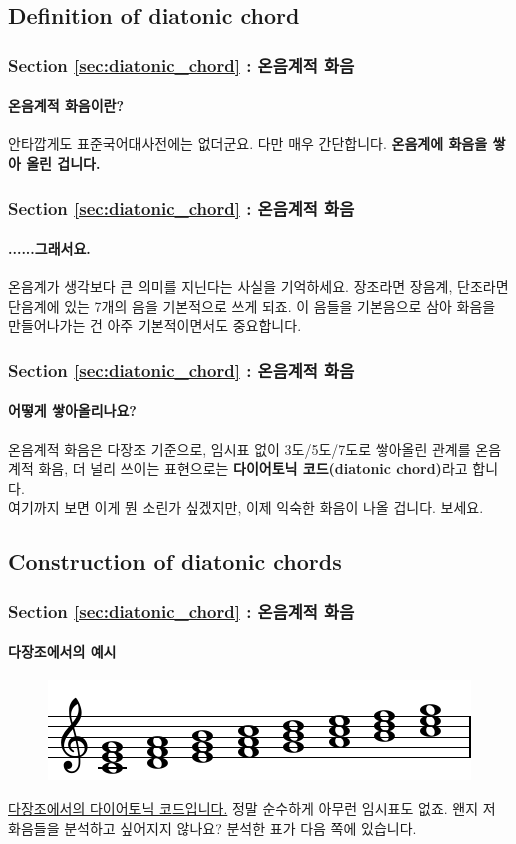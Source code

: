 \documentclass{beamer}
\begin{document}
	\subsection{Definition of diatonic chord}
	\begin{frame}
		\frametitle{Section \ref{sec:diatonic_chord} : 온음계적 화음}
		\framesubtitle{온음계적 화음이란?}
		안타깝게도 표준국어대사전에는 없더군요. 다만 매우 간단합니다. {\bf 온음계에 화음을 쌓아 올린 겁니다.}
	\end{frame}
	
	\begin{frame}
		\frametitle{Section \ref{sec:diatonic_chord} : 온음계적 화음}
		\framesubtitle{......그래서요.}
		온음계가 생각보다 큰 의미를 지닌다는 사실을 기억하세요. 장조라면 장음계, 단조라면 단음계에 있는 7개의 음을 기본적으로 쓰게 되죠. 이 음들을 기본음으로 삼아 화음을 만들어나가는 건 아주 기본적이면서도 중요합니다.
	\end{frame}
	
	\begin{frame}
		\frametitle{Section \ref{sec:diatonic_chord} : 온음계적 화음}
		\framesubtitle{어떻게 쌓아올리나요?}
		온음계적 화음은 다장조 기준으로, 임시표 없이 3도/5도/7도로 쌓아올린 관계를 온음계적 화음, 더 널리 쓰이는 표현으로는 {\bf 다이어토닉 코드(diatonic chord)}라고 합니다.\\
		여기까지 보면 이게 뭔 소린가 싶겠지만, 이제 익숙한 화음이 나올 겁니다. 보세요.
	\end{frame}
	
	\subsection{Construction of diatonic chords}
	\begin{frame}
		\frametitle{Section \ref{sec:diatonic_chord} : 온음계적 화음}
		\framesubtitle{다장조에서의 예시}
		\begin{figure}
			\centering
			\includegraphics[width=\textwidth]{res/pdf/10/chord/major_triad.pdf}
		\end{figure}
		{\color{cyan}\href{run:res/mp3/10/chord/major_diatonic_chord.mp3}{다장조에서의 다이어토닉 코드입니다.}} 정말 순수하게 아무런 임시표도 없죠. 왠지 저 화음들을 분석하고 싶어지지 않나요? 분석한 표가 다음 쪽에 있습니다.
	\end{frame}
	
\end{document}
